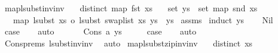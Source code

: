 \begin{isabellebody}
\endisatagproof
{\isafoldproof}%
%
\isadelimproof
\isanewline
%
\endisadelimproof
\isanewline
\isanewline
{}\isamarkupfalse%
\ map{\isacharunderscore}{\kern0pt}lsubst{\isacharunderscore}{\kern0pt}inv{\isacharunderscore}{\kern0pt}inv{\isacharcolon}{\kern0pt}\isanewline
\ \ \ {\isachardoublequoteopen}distinct\ {\isacharparenleft}{\kern0pt}map\ fst\ xs{\isacharparenright}{\kern0pt}{\isachardoublequoteclose}\isanewline
\ \ \ {\isachardoublequoteopen}set\ ys\ {\isasymsubseteq}\ set\ {\isacharparenleft}{\kern0pt}map\ snd\ xs{\isacharparenright}{\kern0pt}{\isachardoublequoteclose}\isanewline
\ \ \ {\isachardoublequoteopen}map\ {\isacharparenleft}{\kern0pt}lsubst\ xs\ o\ lsubst\ {\isacharparenleft}{\kern0pt}swap{\isacharunderscore}{\kern0pt}list\ xs{\isacharparenright}{\kern0pt}{\isacharparenright}{\kern0pt}\ ys\ {\isacharequal}{\kern0pt}\ ys{\isachardoublequoteclose}\isanewline
%
\isadelimproof
%
\endisadelimproof
%
\isatagproof
{}\isamarkupfalse%
\ assms\isanewline
{}\isamarkupfalse%
\ {\isacharparenleft}{\kern0pt}induct\ ys{\isacharparenright}{\kern0pt}\isanewline
\ \ \isamarkupfalse%
\ Nil\isanewline
\ \ \isamarkupfalse%
\ \isamarkupfalse%
\ {\isacharquery}{\kern0pt}case\isanewline
\ \ \isamarkupfalse%
\ auto\isanewline
\ \ \isamarkupfalse%
\isanewline
{}\isamarkupfalse%
\isanewline
\ \ \isamarkupfalse%
\ {\isacharparenleft}{\kern0pt}Cons\ a\ ys{\isacharparenright}{\kern0pt}\isanewline
\ \ \isamarkupfalse%
\ \isamarkupfalse%
\ {\isacharquery}{\kern0pt}case\isanewline
\ \ \isamarkupfalse%
\ auto\isanewline
\ \ \isamarkupfalse%
\ Cons{\isachardot}{\kern0pt}prems{\isacharparenleft}{\kern0pt}{}{\isacharparenright}{\kern0pt}\ lsubst{\isacharunderscore}{\kern0pt}inv{\isacharunderscore}{\kern0pt}inv\ \isamarkupfalse%
\ auto\isanewline
{}\isamarkupfalse%
%
\endisatagproof
{\isafoldproof}%
%
\isadelimproof
\isanewline
%
\endisadelimproof
\isanewline
\isanewline
{}\isamarkupfalse%
\ map{\isacharunderscore}{\kern0pt}lsubst{\isacharunderscore}{\kern0pt}zip{\isacharunderscore}{\kern0pt}inv{\isacharunderscore}{\kern0pt}inv{\isacharcolon}{\kern0pt}\isanewline
\ \ \ {\isachardoublequoteopen}distinct\ xs{\isachardoublequoteclose}\isanewline

\end{isabellebody}

